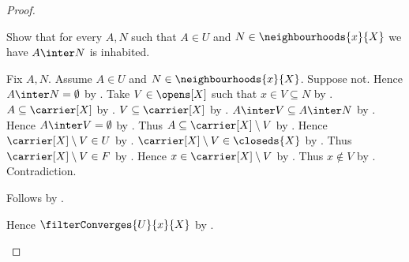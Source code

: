 \begin{proof}
\begin{subproof}
\begin{subproof}
            Show that for every $A,N$ such that $A\in U$ and
                $N\in\neighbourhoods{x}{X}$ we have
                $A\inter N$ is inhabited.
            \begin{subproof}
                Fix $A,N$.
                Assume $A\in U$ and $N\in\neighbourhoods{x}{X}$.
                Suppose not.
                Hence $A\inter N=\emptyset$
                    by .
                Take $V\in\opens[X]$ such that $x\in V\subseteq N$
                    by .
                $A\subseteq\carrier[X]$ by .
                $V\subseteq\carrier[X]$ by .
                $A\inter V\subseteq A\inter N$
                    by .
                Hence $A\inter V=\emptyset$
                    by .
                Thus $A\subseteq\carrier[X]\setminus V$
                    by .
                Hence $\carrier[X]\setminus V\in U$
                    by .
                $\carrier[X]\setminus V\in\closeds{X}$
                    by .
                Thus $\carrier[X]\setminus V\in F$
                    by .
                Hence $x\in\carrier[X]\setminus V$
                    by .
                Thus $x\notin V$ by .
                Contradiction.
            \end{subproof}
            Follows by .
        \end{subproof}
        Hence $\filterConverges{U}{x}{X}$
            by .
    \end{subproof}


\end{proof}
